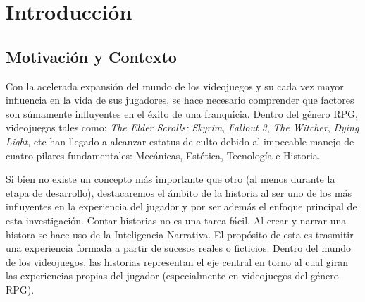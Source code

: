 \chapter{Introducción}



\section{Motivación y Contexto}


Con la acelerada expansión del mundo de los videojuegos y su cada vez mayor influencia en la vida de sus jugadores, se hace necesario comprender que factores son súmamente influyentes en el éxito de una franquicia. Dentro del género \ac{RPG}, videojuegos tales como: \textit{The Elder Scrolls: Skyrim}, \textit{Fallout 3}, \textit{The Witcher}, \textit{Dying Light}, etc han llegado a alcanzar estatus de culto debido al impecable manejo de cuatro pilares fundamentales: Mecánicas, Estética, Tecnología e Historia. 

Si bien no existe un concepto más importante que otro (al menos durante la etapa de desarrollo), destacaremos el ámbito de la historia al ser uno de los más influyentes en la experiencia del jugador y por ser además el enfoque principal de esta investigación. Contar historias no es una tarea fácil. Al crear y narrar una histora se hace uso de la Inteligencia Narrativa. El propósito de esta es trasmitir una experiencia formada a partir de sucesos reales o ficticios. Dentro del mundo de los videojuegos, las historias representan el eje central en torno al cual giran las experiencias propias del jugador (especialmente en videojuegos del género \ac{RPG}).


